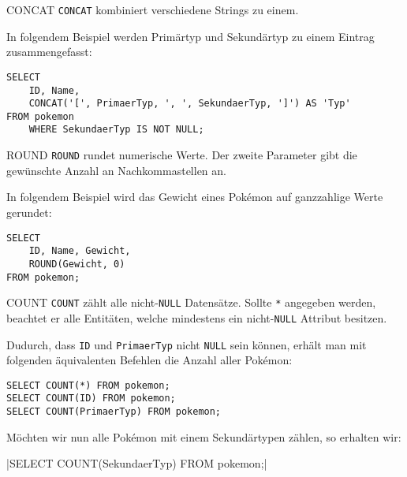 \begin{sql}{CONCAT}
    \texttt{CONCAT} kombiniert verschiedene Strings zu einem.

    In folgendem Beispiel werden Primärtyp und Sekundärtyp zu einem Eintrag zusammengefasst:

    \begin{verbatim}
SELECT
    ID, Name,
    CONCAT('[', PrimaerTyp, ', ', SekundaerTyp, ']') AS 'Typ'
FROM pokemon
    WHERE SekundaerTyp IS NOT NULL;
    \end{verbatim}

    
\end{sql}

\begin{sql}{ROUND}
    \texttt{ROUND} rundet numerische Werte.
    Der zweite Parameter gibt die gewünschte Anzahl an Nachkommastellen an.

    In folgendem Beispiel wird das Gewicht eines Pokémon auf ganzzahlige Werte gerundet:

    \begin{verbatim}
SELECT
    ID, Name, Gewicht,
    ROUND(Gewicht, 0)
FROM pokemon;
    \end{verbatim}

    
\end{sql}

\begin{sql}{COUNT}
    \texttt{COUNT} zählt alle nicht-\texttt{NULL} Datensätze.
    Sollte \texttt{*} angegeben werden, beachtet er alle Entitäten, welche mindestens ein nicht-\texttt{NULL} Attribut besitzen.

    Dudurch, dass \texttt{ID} und \texttt{PrimaerTyp} nicht \texttt{NULL} sein können, erhält man mit folgenden äquivalenten Befehlen die Anzahl aller Pokémon:

    \begin{verbatim}
SELECT COUNT(*) FROM pokemon;
SELECT COUNT(ID) FROM pokemon;
SELECT COUNT(PrimaerTyp) FROM pokemon;
    \end{verbatim}

    

    Möchten wir nun alle Pokémon mit einem Sekundärtypen zählen, so erhalten wir: 

    |SELECT COUNT(SekundaerTyp) FROM pokemon;|

    
\end{sql}

